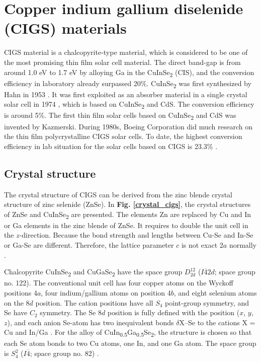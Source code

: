 \documentclass[a4paper, 12pt, titlepage,oneside,drop]{kthesis}
\begin{document}
\section{Copper indium gallium diselenide (CIGS) materials}
CIGS material is a chalcopyrite-type material, which is considered to be one of the most promising thin film solar cell material. The direct band-gap is from around 1.0 eV to 1.7 eV by alloying Ga in the CuInSe\textsubscript{2} (CIS),  and the conversion efficiency in laboratory already surpassed 20\%. 
CuInSe\textsubscript{2} was first synthesized by Hahn in 1953 \cite{ZAAC}. It was first exploited as an absorber material in a single crystal solar cell in 1974 \cite{CuInSe21974}, which is based on CuInSe\textsubscript{2} and CdS. The conversion efficiency is around 
5\%. The first thin film solar cells based on CuInSe\textsubscript{2} and CdS was invented by Kazmerski. During 1980s, Boeing Corporation did much research on the thin film polycrystalline CIGS solar cells. 
To date, the highest conversion efficiency in lab situation for the solar cells based on CIGS is 23.3\% \cite{ward2014cu}.


\subsection{Crystal structure}
The crystal structure of CIGS can be derived from the zinc blende crystal structure of zinc selenide (ZnSe). In \textbf{Fig. \ref{crystal_cigs}}, the crystal structures of ZnSe and CuInSe\textsubscript{2} are presented. 
The elements Zn are replaced by Cu and In or Ga elements in the zinc blende of ZnSe. It requires to double the unit cell in the $z$-direction. Because the bond strength and lengths between
Cu-Se and In-Se or Ga-Se are different. Therefore, the lattice parameter $c$ is not exact 2$a$ normally \cite{chen2009crystal}.

Chalcopyrite CuInSe\textsubscript{2} and CuGaSe\textsubscript{2} have the space group $D_{2d}^{12}$ ($I\overline{4}2d$; space group no. 122).
The conventional unit cell has four copper atoms on the Wyckoff positions 4$a$, four indium/gallium atoms on position 4$b$, and eight selenium atoms on the 8$d$ position. 
The cation positions have all $S_4$ point-group symmetry, and Se have $C_2$ symmetry. 
The Se 8$d$ position is fully defined with the position ($x$, $y$, $z$), and each anion Se-atom has two inequivalent bonds $\delta$X–Se to the cations X = Cu and In/Ga \cite{parlak2006ab, hones2008polarization,persson2008anisotropic}. 
For the alloy of CuIn\textsubscript{0.5}Ga\textsubscript{0.5}Se\textsubscript{2}, the structure is chosen so that each Se atom bonds to two Cu atoms, one In, and one Ga atom. The space group is $S_{4}^{2}$ ($I\overline{4}$; space 
group no. 82) \cite{li2011electronic}.
\end{document}
